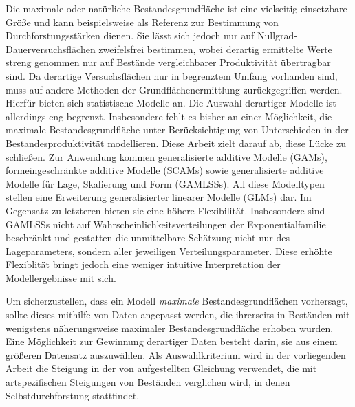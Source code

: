 {
  \newcommand{\mysectiontitle}{Zusammenfassung} %
  \markboth{\mysectiontitle{}}{} %

  \pagestyle{zusammenfassung}

  Die maximale oder natürliche Bestandesgrundfläche ist eine vielseitig einsetzbare Größe und kann beispielsweise als Referenz zur Bestimmung von Durchforstungsstärken dienen.  Sie lässt sich jedoch nur auf Nullgrad-Dauerversuchsflächen zweifelsfrei bestimmen, wobei derartig ermittelte Werte streng genommen nur auf Bestände vergleichbarer Produktivität übertragbar sind.  Da derartige Versuchsflächen nur in begrenztem Umfang vorhanden sind, muss auf andere Methoden der Grundflächenermittlung zurückgegriffen werden.  Hierfür bieten sich statistische Modelle an.  Die Auswahl derartiger Modelle ist allerdings eng begrenzt. Insbesondere fehlt es bisher an einer Möglichkeit, die maximale Bestandesgrundfläche unter Berücksichtigung von Unterschieden in der Bestandesproduktivität modellieren.  Diese Arbeit zielt darauf ab, diese Lücke zu schließen.  Zur Anwendung kommen generalisierte additive Modelle (GAMs), formeingeschränkte additive Modelle (SCAMs) sowie generalisierte additive Modelle für Lage, Skalierung und Form (GAMLSSs).  All diese Modelltypen stellen eine Erweiterung generalisierter linearer Modelle (GLMs) dar.  Im Gegensatz zu letzteren bieten sie eine höhere Flexibilität.  Insbesondere sind GAMLSSs nicht auf Wahrscheinlichkeitsverteilungen der Exponentialfamilie beschränkt und gestatten die unmittelbare Schätzung nicht nur des Lageparameters, sondern aller jeweiligen Verteilungsparameter.  Diese erhöhte Flexiblität bringt jedoch eine weniger intuitive Interpretation der Modellergebnisse mit sich.
  
  Um sicherzustellen, dass ein Modell \emph{maximale} Bestandesgrundflächen vorhersagt, sollte dieses mithilfe von Daten angepasst werden, die ihrerseits in Beständen mit wenigstens näherungsweise maximaler Bestandesgrundfläche erhoben wurden.  Eine Möglichkeit zur Gewinnung derartiger Daten besteht darin, sie aus einem größeren Datensatz auszuwählen.  Als Auswahlkriterium wird in der vorliegenden Arbeit die Steigung in der von \textcite{Reineke1933} aufgestellten Gleichung verwendet, die mit artspezifischen Steigungen von Beständen verglichen wird, in denen Selbstdurchforstung stattfindet.
  
}
